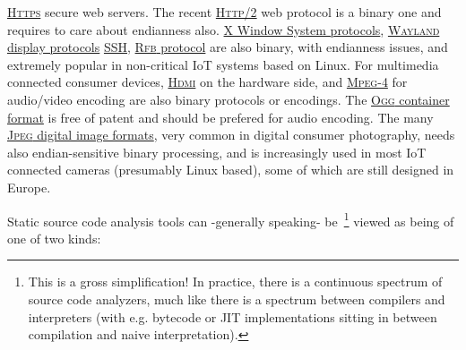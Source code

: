 \href{https://en.wikipedia.org/wiki/HTTPS}{\textsc{Https}}
 secure web servers. The recent
\href{https://en.wikipedia.org/wiki/HTTP/2}{\textsc{Http/2}} web
protocol is a binary one and requires to care about endianness also.
\href{https://en.wikipedia.org/wiki/X_Window_System_protocols_and_architecture}{X
  Window System protocols}, 
\href{https://en.wikipedia.org/wiki/Wayland_(display_server_protocol)}{\textsc{Wayland}
  display protocols} 
\href{https://en.wikipedia.org/wiki/Secure_Shell}{SSH},
\href{https://en.wikipedia.org/wiki/RFB_protocol}{\textsc{Rfb}
  protocol} are also binary, with endianness issues, and extremely
popular in non-critical IoT systems based on Linux. For multimedia
connected consumer devices,
\href{https://en.wikipedia.org/wiki/HDMI}{\textsc{Hdmi}} on the
hardware side, and
\href{https://en.wikipedia.org/wiki/MPEG-4}{\textsc{Mpeg-4}} for
audio/video encoding are also binary protocols or encodings. The
\href{https://en.wikipedia.org/wiki/Ogg}{\textsc{Ogg} container
  format} is free of patent and should be prefered for audio
encoding. The many 
\href{https://en.wikipedia.org/wiki/JPEG}{\textsc{Jpeg} digital image
  formats}, very common in digital consumer
photography, needs also endian-sensitive
binary processing, and is increasingly used in most IoT connected
cameras (presumably Linux based), some of which are still designed in
Europe.

\medskip

Static source code analysis tools  can -generally speaking-
be~\footnote{This is a gross simplification! In practice, there is a
  continuous spectrum of source code analyzers, much like there is a
  spectrum between compilers and interpreters (with e.g. bytecode or
  JIT implementations sitting in between compilation and naive
  interpretation).} viewed as being of one of two kinds:

